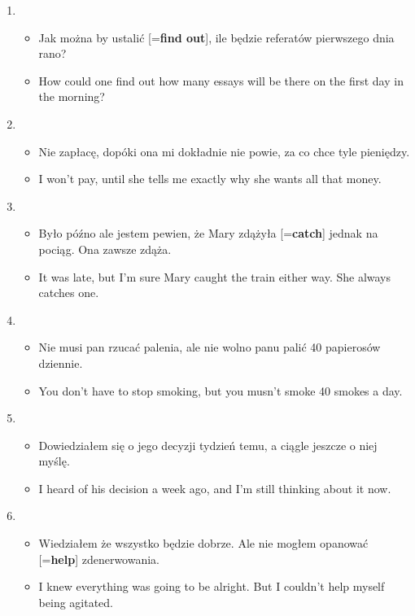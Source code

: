 \documentclass[a4paper]{article}
\begin{document}
\begin{enumerate}
\begin{itemize}
    \end{itemize}
    \item \begin{itemize}
        \item Jak można by ustalić [={\bf find out}], ile będzie referatów pierwszego dnia rano?
        \item How could one find out how many essays will be there on the first day in the morning?
    \end{itemize}
    \item \begin{itemize}
        \item Nie zapłacę, dopóki ona mi dokładnie nie powie, za co chce tyle pieniędzy.
        \item I won't pay, until she tells me exactly why she wants all that money.
    \end{itemize}
    \item \begin{itemize}
        \item Było późno ale jestem pewien, że Mary zdążyła [={\bf catch}] jednak na pociąg. Ona zawsze zdąża.
        \item It was late, but I'm sure Mary caught the train either way. She always catches one.
    \end{itemize}
    \item \begin{itemize}
        \item Nie musi pan rzucać palenia, ale nie wolno panu palić 40 papierosów dziennie.
        \item You don't have to stop smoking, but you musn't smoke 40 smokes a day.
    \end{itemize}
    \item \begin{itemize}
        \item Dowiedziałem się o jego decyzji tydzień temu, a ciągle jeszcze o niej myślę.
        \item I heard of his decision a week ago, and I'm still thinking about it now.
    \end{itemize}
    \item \begin{itemize}
        \item Wiedziałem że wszystko będzie dobrze. Ale nie mogłem opanować [={\bf help}] zdenerwowania.
        \item I knew everything was going to be alright. But I couldn't help myself being agitated.

\end{itemize}
\end{enumerate}
\end{document}
